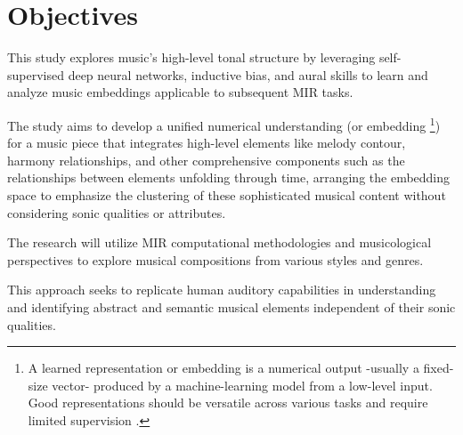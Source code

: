 \section{Objectives}

This study explores music's high-level tonal structure by leveraging self-supervised deep neural networks, inductive bias, and aural skills to learn and analyze music embeddings applicable to subsequent MIR tasks. 

The study aims to develop a unified numerical understanding (or embedding \footnote{A learned representation or embedding is a numerical output -usually a fixed-size vector- produced by a machine-learning model from a low-level input. Good representations should be versatile across various tasks and require limited supervision \cite{Turian2022HEAR:Representations}.}) for a music piece that integrates high-level elements like melody contour, harmony relationships, and other comprehensive components such as the relationships between elements unfolding through time, arranging the embedding space to emphasize the clustering of these sophisticated musical content without considering sonic qualities or attributes. 

The research will utilize MIR computational methodologies and musicological perspectives to explore musical compositions from various styles and genres. 

This approach seeks to replicate human auditory capabilities in understanding and identifying abstract and semantic musical elements independent of their sonic qualities.